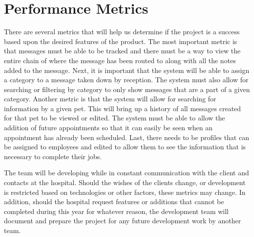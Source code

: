 \documentclass[onecolumn, draftclsnofoot,10pt, compsoc]{IEEEtran}
\begin{document}
\section{Performance Metrics}
There are several metrics that will help us determine if the project is a success based upon the desired features of the product. The most important metric is that messages must be able to be tracked and there must be a way to view the entire chain of where the message has been routed to along with all the notes added to the message. Next, it is important that the system will be able to assign a category to a message taken down by reception. The system must also allow for searching or filtering by category to only show messages that are a part of a given category. Another metric is that the system will allow for searching for information by a given pet. This will bring up a history of all messages created for that pet to be viewed or edited. The system must be able to allow the addition of future appointments so that it can easily be seen when an appointment has already been scheduled. Last, there needs to be profiles that can be assigned to employees and edited to allow them to see the information that is necessary to complete their jobs.

The team will be developing while in constant communication with the client and contacts at the hospital. Should the wishes of the clients change, or development is restricted based on technologies or other factors, these metrics may change. In addition, should the hospital request features or additions that cannot be completed during this year for whatever reason, the development team will document and prepare the project for any future development work by another team.
\end{document}
